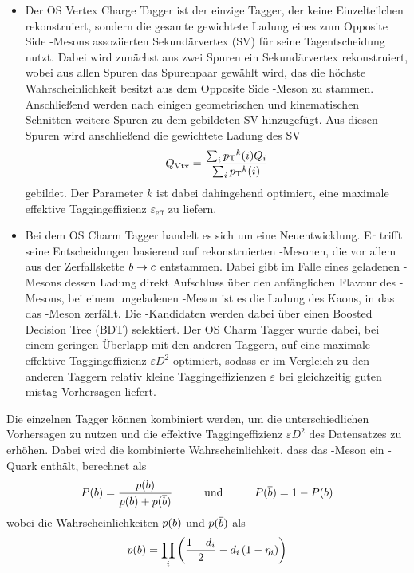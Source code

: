 \begin{itemize}
\item Der OS Vertex Charge Tagger ist der einzige Tagger, der keine Einzelteilchen rekonstruiert, sondern die gesamte gewichtete Ladung eines zum Opposite Side \B-Mesons assoziierten Sekundärvertex (SV) für seine Tagentscheidung nutzt. Dabei wird zunächst aus zwei Spuren ein Sekundärvertex rekonstruiert, wobei aus allen Spuren das Spurenpaar gewählt wird, das die höchste Wahrscheinlichkeit besitzt aus dem Opposite Side \B-Meson zu stammen. Anschließend werden nach einigen geometrischen und kinematischen Schnitten weitere Spuren zu dem gebildeten SV hinzugefügt. Aus diesen Spuren wird anschließend die gewichtete Ladung des SV
\begin{equation}
Q_\text{Vtx}=\frac{\sum_{i}\mbox{$p_{\rm T}$}^k(i)Q_i}{\sum_{i}\mbox{$p_{\rm T}$}^k(i)}
\end{equation}
gebildet. Der Parameter $k$ ist dabei dahingehend optimiert, eine maximale effektive Taggingeffizienz $\varepsilon_\text{eff}$ zu liefern.
\item Bei dem OS Charm Tagger handelt es sich um eine Neuentwicklung. Er trifft seine Entscheidungen basierend auf rekonstruierten \D-Mesonen, die vor allem aus der Zerfallskette ${b}\rightarrow{\ensuremath{c}}$ entstammen. Dabei gibt im Falle eines geladenen \D-Mesons dessen Ladung direkt Aufschluss über den anfänglichen Flavour des \B-Mesons, bei einem ungeladenen \D-Meson ist es die Ladung des Kaons, in das das \D-Meson zerfällt. Die \D-Kandidaten werden dabei über einen Boosted Decision Tree (BDT) selektiert. Der OS Charm Tagger wurde dabei, bei einem geringen Überlapp mit den anderen Taggern, auf eine maximale effektive Taggingeffizienz $\varepsilon D^2$ optimiert, sodass er im Vergleich zu den anderen Taggern relativ kleine Taggingeffizienzen $\varepsilon$ bei gleichzeitig guten mistag-Vorhersagen liefert.
\end{itemize}
Die einzelnen Tagger können kombiniert werden, um die unterschiedlichen Vorhersagen zu nutzen und die effektive Taggingeffizienz $\varepsilon D^2$ des Datensatzes zu erhöhen. Dabei wird die kombinierte Wahrscheinlichkeit, dass das \B-Meson ein \bquark-Quark enthält, berechnet als
\begin{equation}
P({b})=\frac{p({b})}{p({b})+p({\overline {{b}}})} \hspace{1cm}\text{und}\hspace{1cm}P({\overline {{b}}})=1-P({b})
\end{equation}
wobei die Wahrscheinlichkeiten $p({b})$ und $p({\overline {{b}}})$ als
\begin{equation}
p({b})=\prod_{i}\left(\frac{1+d_i}{2}-d_i\left(1-\eta_i\right)\right)
\end{equation}
